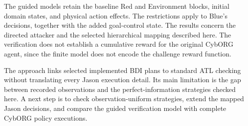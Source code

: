 \documentclass[runningheads]{llncs}
\begin{document}
The guided models retain the baseline Red and Environment blocks,
initial domain states, and physical action effects. The restrictions
apply to Blue's decisions, together with the added goal-control state.
The results concern the directed attacker and the selected hierarchical
mapping described here. The verification does not establish a cumulative
reward for the original CybORG agent, since the finite model does not
encode the challenge reward function.

The approach links selected implemented BDI plans to standard ATL checking without translating every Jason execution detail. Its main limitation is the gap between recorded observations and the perfect-information strategies checked here. A next step is to check observation-uniform strategies, extend the mapped Jason decisions, and compare the guided verification model with complete CybORG policy executions.



\end{document}
